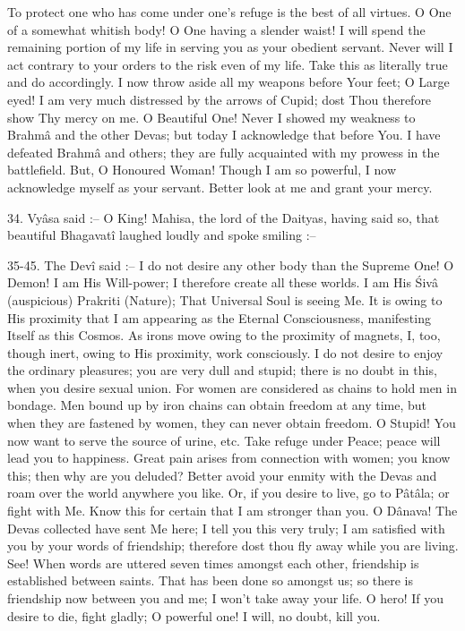 To protect one who has come under one's refuge is the best of all virtues. O One of a somewhat whitish body! O One having a slender waist! I will spend the remaining portion of my life in serving you as your obedient servant. Never will I act contrary to your orders to the risk even of my life. Take this as literally true and do accordingly. I now throw aside all my weapons before Your feet; O Large eyed! I am very much distressed by the arrows of Cupid; dost Thou therefore show Thy mercy on me. O Beautiful One! Never I showed my weakness to Brahm\^a and the other Devas; but today I acknowledge that before You. I have defeated Brahm\^a and others; they are fully acquainted with my prowess in the battlefield. But, O Honoured Woman! Though I am so powerful, I now acknowledge myself as your servant. Better look at me and grant your mercy.

34. Vy\^asa said :-- O King! Mahisa, the lord of the Daityas, having said so, that beautiful Bhagavat\^i laughed loudly and spoke smiling :--

35-45. The Dev\^i said :-- I do not desire any other body than the Supreme One! O Demon! I am His Will-power; I therefore create all these worlds. I am His \'Siv\^a (auspicious) Prakriti (Nature); That Universal Soul is seeing Me. It is owing to His proximity that I am appearing as the Eternal Consciousness, manifesting Itself as this Cosmos. As irons move owing to the proximity of magnets, I, too, though inert, owing to His proximity, work consciously. I do not desire to enjoy the ordinary pleasures; you are very dull and stupid; there is no doubt in this, when you desire sexual union. For women are considered as chains to hold men in bondage. Men bound up by iron chains can obtain freedom at any time, but when they are fastened by women, they can never obtain freedom. O Stupid! You now want to serve the source of urine, etc. Take refuge under Peace; peace will lead you to happiness. Great pain arises from connection with women; you know this; then why are you deluded? Better avoid your enmity with the Devas and roam over the world anywhere you like. Or, if you desire to live, go to P\^at\^ala; or fight with Me. Know this for certain that I am stronger than you. O D\^anava! The Devas collected have sent Me here; I tell you this very truly; I am satisfied with you by your words of friendship; therefore dost thou fly away while you are living. See! When words are uttered seven times amongst each other, friendship is established between saints. That has been done so amongst us; so there is friendship now between you and me; I won't take away your life. O hero! If you desire to die, fight gladly; O powerful one! I will, no doubt, kill you.

